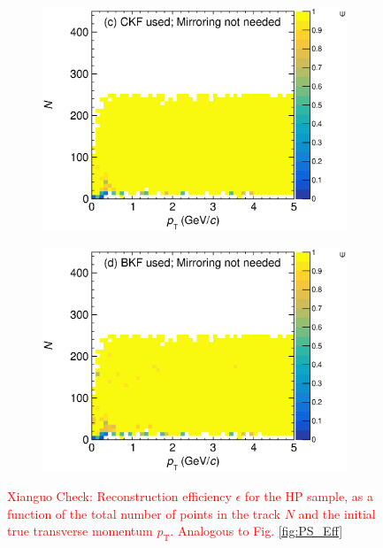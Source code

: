 \begin{figure}[!ht]
\begin{subfigure}[b]{0.48\textwidth}
         \centering
         \includegraphics[width=\textwidth]{figures/Appendix/testNDGArMirrorEfficiencyVSNPointsVSpT_NoMirror.eps}
         \caption{}
         \label{fig:HP_Eff_CKF_NoMirror}
     \end{subfigure}
     \begin{subfigure}[b]{0.48\textwidth}
         \centering
         \includegraphics[width=\textwidth]{figures/Appendix/testNDGArMirrorEfficiencyVSNPointsVSpT_BKF_NoMirror.eps}
         \caption{}
         \label{fig:HP_Eff_BKF_NoMirror}
     \end{subfigure}
        \caption{\textcolor{red}{Xianguo Check: Reconstruction efficiency $\epsilon$ for the HP sample, as a function of the total number of points in the track $N$ and the initial true transverse momentum $p_\textrm{T}$. Analogous to Fig. \ref{fig:PS_Eff}}} \label{fig:HP_Eff}
\end{figure}
\clearpage

